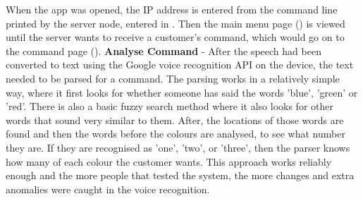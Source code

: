 When the app was opened, the IP address is entered from the command line printed by the server node, entered in \textbf{}. Then the main menu page (\textbf{}) is viewed until the server wants to receive a customer's command, which would go on to the command page (\textbf{}).
\newline\newline
\textbf{Analyse Command} - After the speech had been converted to text using the Google voice recognition API on the device, the text needed to be parsed for a command. The parsing works in a relatively simple way, where it first looks for whether someone has said the words 'blue', 'green' or 'red'. There is also a basic fuzzy search method where it also looks for other words that sound very similar to them. After, the locations of those words are found and then the words before the colours are analysed, to see what number they are. If they are recognised as 'one', 'two', or 'three', then the parser knows how many of each colour the customer wants. This approach works reliably enough and the more people that tested the system, the more changes and extra anomalies were caught in the voice recognition.
